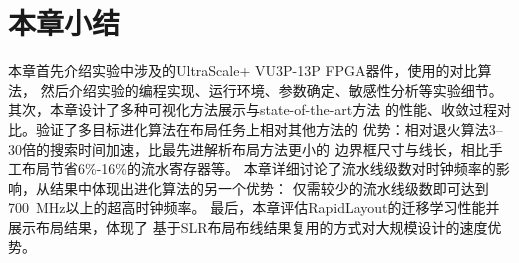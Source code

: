 \section{本章小结}

本章首先介绍实验中涉及的UltraScale+ VU3P-13P FPGA器件，使用的对比算法，
然后介绍实验的编程实现、运行环境、参数确定、敏感性分析等实验细节。
其次，本章设计了多种可视化方法展示与state-of-the-art方法
的性能、收敛过程对比。验证了多目标进化算法在布局任务上相对其他方法的
优势：相对退火算法3--30倍的搜索时间加速，比最先进解析布局方法更小的
边界框尺寸与线长，相比手工布局节省6\%-16\%的流水寄存器等。
本章详细讨论了流水线级数对时钟频率的影响，从结果中体现出进化算法的另一个优势：
仅需较少的流水线级数即可达到700~MHz以上的超高时钟频率。
最后，本章评估RapidLayout的迁移学习性能并展示布局结果，体现了
基于SLR布局布线结果复用的方式对大规模设计的速度优势。










































































